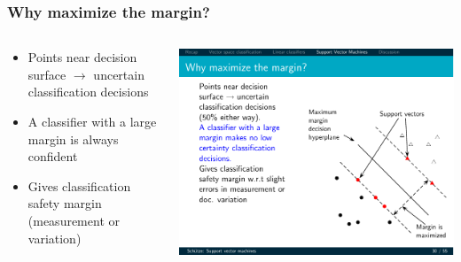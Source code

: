 \documentclass[compress]{beamer}
\newcommand{\1}{\mathbf{1}}
\begin{document}
\begin{frame}
\begin{columns}[t]
\begin{column}{6cm}

\end{column}
\end{columns}
\end{frame}



\begin{frame}
\frametitle{Why maximize the margin?}
\begin{columns}[t]
\begin{column}{4cm}
\begin{itemize}
\item Points near decision surface $\rightarrow$ uncertain classification decisions
\item A classifier with a large margin is always confident
\item Gives classification safety margin (measurement or variation)
\end{itemize}

\end{column}
\begin{column}{6cm}

\centerline{ \includegraphics[width=.9\linewidth]{svm/margin_3} }

\end{column}
\end{columns}
\end{frame}
\end{document}
